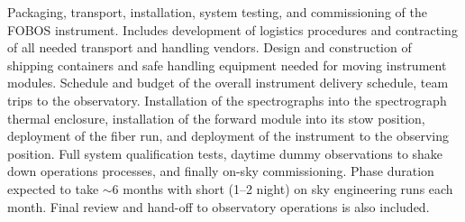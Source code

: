 \documentclass[oneside,11pt]{amsart}
\begin{document}
Packaging, transport, installation, system testing, and commissioning
of the FOBOS instrument. Includes development of logistics procedures
and contracting of all needed transport and handling vendors. Design
and construction of shipping containers and safe handling equipment
needed for moving instrument modules. Schedule and budget of the
overall instrument delivery schedule, team trips to the observatory.
Installation of the spectrographs into the spectrograph thermal
enclosure, installation of the forward module into its stow position,
deployment of the fiber run, and deployment of the instrument to the
observing position. Full system qualification tests, daytime dummy
observations to shake down operations processes, and finally on-sky
commissioning. Phase duration expected to take $\sim$6 months with
short (1--2 night) on sky engineering runs each month. Final review
and hand-off to observatory operations is also included.
\end{document}
